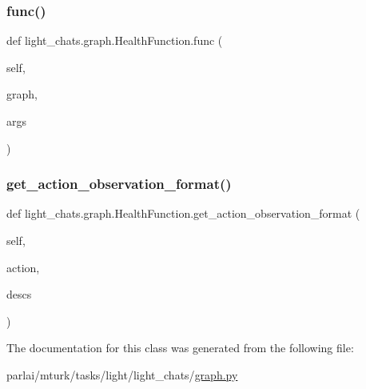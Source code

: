 \subsubsection{\texorpdfstring{func()}{func()}}
{\footnotesize\ttfamily def light\+\_\+chats.\+graph.\+Health\+Function.\+func (\begin{DoxyParamCaption}\item[{}]{self,  }\item[{}]{graph,  }\item[{}]{args }\end{DoxyParamCaption})}

\mbox{\label{classlight__chats_1_1graph_1_1HealthFunction_a436cadbb6f2ae2cb77521c013caa8063}} 
\subsubsection{\texorpdfstring{get\+\_\+action\+\_\+observation\+\_\+format()}{get\_action\_observation\_format()}}
{\footnotesize\ttfamily def light\+\_\+chats.\+graph.\+Health\+Function.\+get\+\_\+action\+\_\+observation\+\_\+format (\begin{DoxyParamCaption}\item[{}]{self,  }\item[{}]{action,  }\item[{}]{descs }\end{DoxyParamCaption})}



The documentation for this class was generated from the following file\+:\begin{DoxyCompactItemize}
\item 
parlai/mturk/tasks/light/light\+\_\+chats/\hyperlink{parlai_2mturk_2tasks_2light_2light__chats_2graph_8py}{graph.\+py}\end{DoxyCompactItemize}
